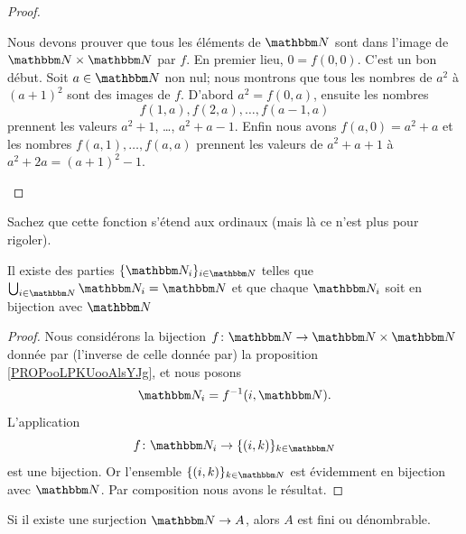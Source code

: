 \begin{proof}
\begin{subproof}
        \item[\( f\) est surjective]

            Nous devons prouver que tous les éléments de \( \eN\) sont dans l'image de \( \eN\times \eN\) par \( f\). En premier lieu, \( 0=f(0,0)\). C'est un bon début. Soit \( a\in \eN\) non nul; nous montrons que tous les nombres de \( a^2\) à \( (a+1)^2\) sont des images de \( f\). D'abord \( a^2=f(0,a)\), ensuite les nombres
            \begin{equation}
                f(1,a),f(2,a),\ldots, f(a-1,a)
            \end{equation}
            prennent les valeurs \( a^2+1\), \ldots, \( a^2+a-1\). Enfin nous avons \( f(a,0)=a^2+a\) et les nombres \( f(a,1),\ldots, f(a,a)\) prennent les valeurs de \( a^2+a+1\) à \( a^2+2a=(a+1)^2-1\).
    \end{subproof}
\end{proof}
Sachez que cette fonction s'étend aux ordinaux (mais là ce n'est plus pour rigoler).

\begin{corollary}       \label{CORooNRPIooZPSmqa}
    Il existe des parties \( \{ \eN_i \}_{i\in \eN}\) telles que \( \bigcup_{i\in \eN}\eN_i=\eN\) et que chaque \( \eN_i\) soit en bijection avec \( \eN\)
\end{corollary}

\begin{proof}
    Nous considérons la bijection \( f\colon \eN\to \eN\times \eN\) donnée par (l'inverse de celle donnée par) la proposition \ref{PROPooLPKUooAlsYJg}, et nous posons
    \begin{equation}
        \eN_i=f^{-1}(i,\eN).
    \end{equation}
    L'application
    \begin{equation}
        f\colon \eN_i\to \{ (i,k) \}_{k\in \eN}
    \end{equation}
    est une bijection. Or l'ensemble \( \{ (i,k) \}_{k\in \eN}\) est évidemment en bijection avec \( \eN\). Par composition nous avons le résultat.
\end{proof}

\begin{lemma}        \label{LEMooDLWFooNAJbbq}
    Si il existe une surjection \( \eN\to A\), alors \( A\) est fini ou dénombrable.
\end{lemma}

